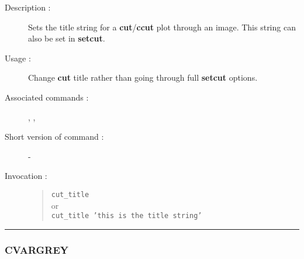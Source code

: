 \begin{description}

\item[Description :] Sets the title string for a {\bf cut}/{\bf ccut}
plot through an image.  This string can also be set in {\bf setcut}.

\item[Usage :] Change {\bf cut} title rather than going through full
{\bf setcut} options.
\item[Associated commands :] {\tt {}},
{\tt {}}, {\tt {}}
\item[Short version of command :] -
\item[Invocation :]

\begin{quote}{\tt  cut\_title }\\
or \\
{\tt cut\_title 'this is the title string' }
\end{quote}

\end{description}

\hrule
\subsubsection*{\label{CVARGREY}CVARGREY}

